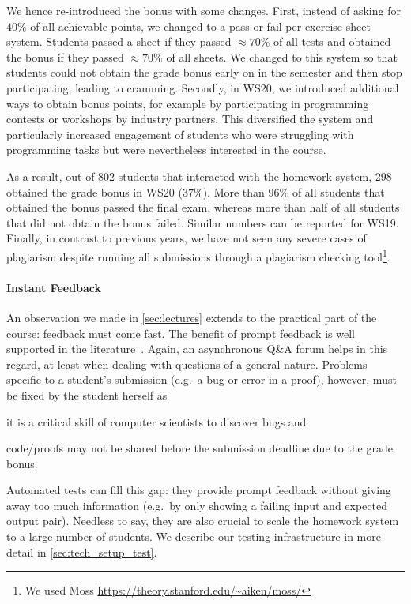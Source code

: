 We hence re-introduced the bonus with some changes.
First, instead of asking for $40\%$ of all achievable points,
we changed to a pass-or-fail per exercise sheet system.
Students passed a sheet if they
passed $\approx 70\%$ of all tests
and obtained the bonus if they passed $\approx 70\%$ of all sheets.
We changed to this system so that students
could not obtain the grade bonus early on in the semester and then stop participating,
leading to cramming.
Secondly, in WS20, we introduced additional ways to
obtain bonus points,
for example by participating in programming contests or workshops by industry partners.
This diversified the system and
particularly increased engagement of
students who were struggling
with programming tasks but were nevertheless interested in the course.

As a result, out of 802 students that interacted with the homework system,
298 obtained the grade bonus in WS20 ($37\%$).
More than $96\%$ of all students that obtained the bonus
passed the final exam,
whereas more than half of all students that did not obtain the bonus failed.
Similar numbers can be reported for WS19.
Finally, in contrast to previous years,
we have not seen any severe cases of plagiarism despite
running all submissions through a plagiarism checking tool\footnote{We used Moss \url{https://theory.stanford.edu/~aiken/moss/}}.

\paragraph{Instant Feedback}
An observation we made in \cref{sec:lectures}
extends to the practical part of the course:
feedback must come fast.
The benefit of prompt feedback is well supported in the literature~\cite{onlineengagement2,onlineengagement4}.
Again, an asynchronous Q\&A forum helps in this regard,
at least when dealing with questions of a general nature.
Problems specific to a student's submission (e.g.\ a bug or error in a proof),
however, must be fixed by the student herself as
\begin{enumerate*}[label=\arabic*)]
  \item it is a critical skill of computer scientists to discover bugs and
  \item code/proofs may not be shared before the submission deadline due to the grade bonus.
\end{enumerate*}

Automated tests can fill this gap:
they provide prompt feedback without giving away too much information (e.g.\ by only showing a failing input and expected output pair).
Needless to say, they are also crucial to
scale the homework system to a large number of students.
We describe our testing infrastructure in more detail in \cref{sec:tech_setup_test}.

